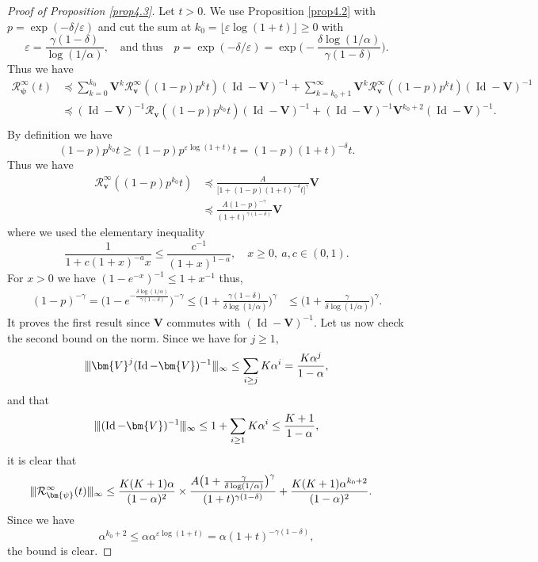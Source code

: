 \documentclass[reqno,final,11pt]{amsart}
\theoremstyle{plain}
\theoremstyle{definition}
\theoremstyle{remark}
\newcommand{\Vvert}{\vert \hspace{-1pt} \vert \hspace{-1pt} \vert}
\newcommand{\Res}{\mathcal{R}}
\DeclareMathOperator{\Id}{Id}
\begin{document}
\begin{proof}[Proof of Proposition \ref{prop4.3}]
	Let $t > 0$. We use Proposition \ref{prop4.2} with $p = \exp(-\delta / \varepsilon)$ and cut the sum at $k_0 = \lfloor\varepsilon \log(1+ t)\rfloor \geq 0$ with \[\varepsilon = \frac{\gamma(1-\delta)}{\log(1/\alpha)}, \quad \text{and thus} \quad p = \exp(-\delta/\varepsilon) = \exp\Big(-\frac{\delta \log(1/\alpha)}{\gamma (1-\delta)} \Big). \]
	Thus we have
	\begin{align*}
		\Res^{\infty}_{\bm{\psi}}(t) & \preceq \sum_{k=0}^{k_0} \bm{V}^k \Res^{\infty}_{\bm{v}}((1-p)p^k t)(\Id-\bm{V})^{-1} + \sum_{k=k_0+1}^{\infty} \bm{V}^k \Res^{\infty}_{\bm{v}}((1-p)p^k t)(\Id-\bm{V})^{-1} \\
		& \preceq  (\Id-\bm{V})^{-1} \Res_{\bm{v}}((1-p)p^{k_0} t)(\Id-\bm{V})^{-1} + (\Id-\bm{V})^{-1} \bm{V}^{k_0+2} (\Id-\bm{V})^{-1}. \\
	\end{align*}
	By definition we have
	\[ (1-p)p^{k_0} t\geq (1-p)p^{\varepsilon\log(1+ t)} t = ( 1 - p) (1+t)^{-\delta} t.\]
	Thus we have
	\begin{align*}
		\Res^{\infty}_{\bm{v}}((1-p)p^{k_0} t) & \preceq \frac{A}{\Big[ 1+ ( 1 -p) (1+t)^{-\delta}t\Big]^{\gamma}} \bm{V} \\
		& \preceq \frac{A (1-p)^{-\gamma}}{( 1+ t)^{\gamma(1-\delta)}} \bm{V}
	\end{align*}
	where we used the elementary inequality \[\frac{1}{1+c(1+x)^{-a}x} \leq  \frac{c^{-1}}{(1+x)^{1-a}}, \quad x\geq 0, \ a,c\in (0,1). \]
	For $x>0$ we have $(1-e^{-x})^{-1}\leq 1+x^{-1}$ thus,
	\begin{align*}
		(1-p)^{-\gamma}  = \Big(1 - e^{-\frac{\delta \log(1/\alpha)}{\gamma(1-\delta)}}\Big)^{-\gamma}  \leq \Big(1 + \frac{\gamma(1-\delta)}{\delta \log(1/\alpha)}\Big)^{\gamma} & \leq \Big(1 + \frac{\gamma}{\delta \log(1/\alpha)}\Big)^{\gamma}.
	\end{align*}
	It proves the first result since $\bm{V}$ commutes with $(\Id-\bm{V})^{-1}$. Let us now check the second bound on the norm. Since we have for $j\geq 1$,
	\[ \Vvert \bm{V}^j(\Id-\bm{V})^{-1} \Vvert_{\infty} \leq \sum_{i\geq j} K\alpha^i = \frac{K \alpha^j}{1-\alpha},\]
	and that
	\[\Vvert (\Id-\bm{V})^{-1} \Vvert_{\infty} \leq 1+\sum_{i\geq 1} K\alpha^i \leq \frac{K +1}{1-\alpha},\]
	it is clear that 
	\begin{align*}
		\Vvert \Res^{\infty}_{\bm{\psi}}(t) \Vvert_{\infty}  & \leq \frac{K(K+1) \alpha}{(1-\alpha)^2} \times \frac{A \big(1 + \frac{\gamma}{\delta \log(1/\alpha)}\big)^{\gamma}}{( 1+ t)^{\gamma(1-\delta)}} + \frac{K(K+1) \alpha^{k_0+2}}{(1-\alpha)^2}.
	\end{align*} 
	Since we have
	\[ \alpha^{k_0+2} \leq \alpha \alpha^{\varepsilon \log(1+t)} = \alpha (1+t)^{-\gamma(1-\delta)},\]
	the bound is clear.
\end{proof}
\end{document}
